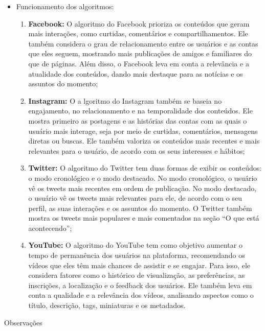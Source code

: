 \documentclass{article}%
\begin{document}
%
\newpage%
\begin{itemize}%
\item%
Funcionamento dos algoritmos:%
\begin{enumerate}[label=-]%
\item%
\textbf{Facebook:} O algoritmo do Facebook prioriza os conteúdos que geram mais interações, como curtidas, comentários e compartilhamentos. Ele também considera o grau de relacionamento entre os usuários e as contas que eles seguem, mostrando mais publicações de amigos e familiares do que de páginas. Além disso, o Facebook leva em conta a relevância e a atualidade dos conteúdos, dando mais destaque para as notícias e os assuntos do momento;%
\item%
\textbf{Instagram:} O a lgoritmo do Instagram também se baseia no engajamento, no relacionamento e na temporalidade dos conteúdos. Ele mostra primeiro as postagens e as histórias das contas com as quais o usuário mais interage, seja por meio de curtidas, comentários, mensagens diretas ou buscas. Ele também valoriza os conteúdos mais recentes e mais relevantes para o usuário, de acordo com os seus interesses e hábitos;%
\item%
\textbf{Twitter:} O algoritmo do Twitter tem duas formas de exibir os conteúdos: o modo cronológico e o modo destacado. No modo cronológico, o usuário vê os tweets mais recentes em ordem de publicação. No modo destacado, o usuário vê os tweets mais relevantes para ele, de acordo com o seu perfil, as suas interações e os assuntos do momento. O Twitter também mostra os tweets mais populares e mais comentados na seção “O que está acontecendo”;%
\item%
\textbf{YouTube:} O algoritmo do YouTube tem como objetivo aumentar o tempo de permanência dos usuários na plataforma, recomendando os vídeos que eles têm mais chances de assistir e se engajar. Para isso, ele considera fatores como o histórico de visualização, as preferências, as inscrições, a localização e o feedback dos usuários. Ele também leva em conta a qualidade e a relevância dos vídeos, analisando aspectos como o título, descrição, tags, miniaturas e os metadados.%
\end{enumerate}%
\end{itemize}%
\newpage%
\begin{minipage}{\textwidth}%
\centering%
\begin{large}%
Observações%
\end{large}%
\end{minipage}%
\end{document}
